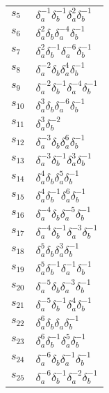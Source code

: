 \documentclass{article}
\begin{document}
\begin{center}
\begin{tabular}{ll}
$s_{5}$ & $\delta_a^{-1}\delta_b^{-1}\delta_a^{2}\delta_b^{-1}$ \\
$s_{6}$ & $\delta_a^{2}\delta_b^{}\delta_a^{-4}\delta_b^{-1}$ \\
$s_{7}$ & $\delta_a^{2}\delta_b^{-1}\delta_a^{-6}\delta_b^{-1}$ \\
$s_{8}$ & $\delta_a^{-2}\delta_b^{}\delta_a^{4}\delta_b^{-1}$ \\
$s_{9}$ & $\delta_a^{-2}\delta_b^{-1}\delta_a^{-4}\delta_b^{-1}$ \\
$s_{10}$ & $\delta_a^{3}\delta_b^{}\delta_a^{-6}\delta_b^{-1}$ \\
$s_{11}$ & $\delta_a^{3}\delta_b^{-2}$ \\
$s_{12}$ & $\delta_a^{-3}\delta_b^{}\delta_a^{6}\delta_b^{-1}$ \\
$s_{13}$ & $\delta_a^{-3}\delta_b^{-1}\delta_a^{3}\delta_b^{-1}$ \\
$s_{14}$ & $\delta_a^{4}\delta_b^{}\delta_a^{5}\delta_b^{-1}$ \\
$s_{15}$ & $\delta_a^{4}\delta_b^{-1}\delta_a^{6}\delta_b^{-1}$ \\
$s_{16}$ & $\delta_a^{-4}\delta_b^{}\delta_a^{-5}\delta_b^{-1}$ \\
$s_{17}$ & $\delta_a^{-4}\delta_b^{-1}\delta_a^{-3}\delta_b^{-1}$ \\
$s_{18}$ & $\delta_a^{5}\delta_b^{}\delta_a^{3}\delta_b^{-1}$ \\
$s_{19}$ & $\delta_a^{5}\delta_b^{-1}\delta_a^{-1}\delta_b^{-1}$ \\
$s_{20}$ & $\delta_a^{-5}\delta_b^{}\delta_a^{-3}\delta_b^{-1}$ \\
$s_{21}$ & $\delta_a^{-5}\delta_b^{-1}\delta_a^{4}\delta_b^{-1}$ \\
$s_{22}$ & $\delta_a^{6}\delta_b^{}\delta_a^{}\delta_b^{-1}$ \\
$s_{23}$ & $\delta_a^{6}\delta_b^{-1}\delta_a^{5}\delta_b^{-1}$ \\
$s_{24}$ & $\delta_a^{-6}\delta_b^{}\delta_a^{-1}\delta_b^{-1}$ \\
$s_{25}$ & $\delta_a^{-6}\delta_b^{-1}\delta_a^{-2}\delta_b^{-1}$ \\
\bottomrule
\end{tabular}
\end{center}

\thispagestyle{empty}
\end{document}

